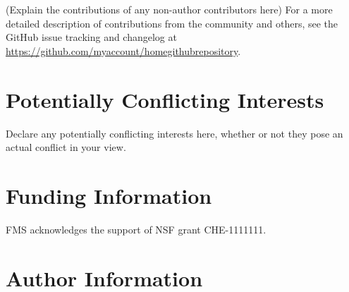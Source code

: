 \documentclass[9pt,bestpractices]{livecoms}
\newcommand{\githubrepository}{\url{https://github.com/myaccount/homegithubrepository}}  %
\begin{document}
(Explain the contributions of any non-author contributors here)
For a more detailed description of contributions from the community and others, see the GitHub issue tracking and changelog at \githubrepository.

\section*{Potentially Conflicting Interests}

Declare any potentially conflicting interests here, whether or not they pose an actual conflict in your view.

\section*{Funding Information}
FMS acknowledges the support of NSF grant CHE-1111111.

\section*{Author Information}
\makeorcid




\end{document}
